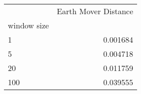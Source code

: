 \begin{tabular}{lr}
\toprule
{} &  Earth Mover Distance \\
window size &                       \\
\midrule
1           &              0.001684 \\
5           &              0.004718 \\
20          &              0.011759 \\
100         &              0.039555 \\
\bottomrule
\end{tabular}
